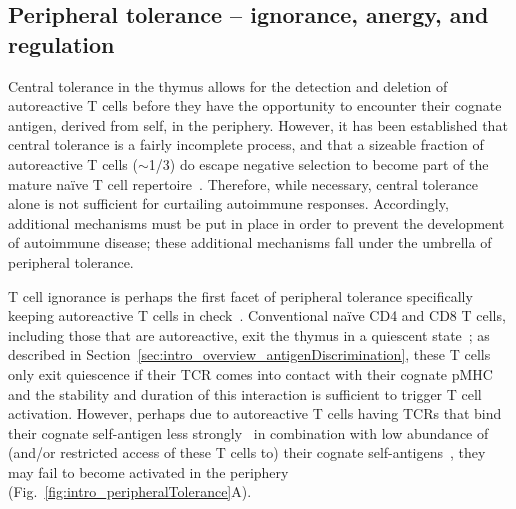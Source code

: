 \subsection{Peripheral tolerance -- ignorance, anergy, and regulation}
\label{sec:intro_autoimmunity_peripheralTolerance}

Central tolerance in the thymus allows for the detection and deletion of autoreactive T cells before they have the opportunity to encounter their cognate antigen, derived from self, in the periphery. However, it has been established that central tolerance is a fairly incomplete process, and that a sizeable fraction of autoreactive T cells ($\sim$1/3) do escape negative selection to become part of the mature na\"{i}ve T cell repertoire~\cite{bouneaud2000impact,gallegos2006central,eltanbouly2021rethinking}. Therefore, while necessary, central tolerance alone is not sufficient for curtailing autoimmune responses. Accordingly, additional mechanisms must be put in place in order to prevent the development of autoimmune disease; these additional mechanisms fall under the umbrella of peripheral tolerance.

T cell ignorance is perhaps the first facet of peripheral tolerance specifically keeping autoreactive T cells in check~\cite{salaman2020breakdown,eltanbouly2021rethinking}. Conventional na\"{i}ve CD4\pos{} and CD8\pos{} T cells, including those that are autoreactive, exit the thymus in a quiescent state~\cite{chapman2020metabolic}; as described in Section~\ref{sec:intro_overview_antigenDiscrimination}, these T cells only exit quiescence if their TCR comes into contact with their cognate pMHC and the stability and duration of this interaction is sufficient to trigger T cell activation. However, perhaps due to autoreactive T cells having TCRs that bind their cognate self-antigen less strongly~\cite{zehn2006t,leube2023single} in combination with low abundance of (and/or restricted access of these T cells to) their cognate self-antigens~\cite{kurts1999cd8,eltanbouly2021rethinking}, they may fail to become activated in the periphery (Fig.~\ref{fig:intro_peripheralTolerance}A). 

